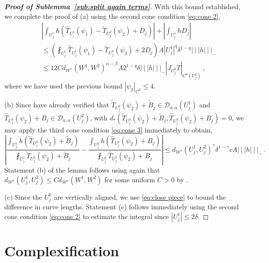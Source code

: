 \documentclass{amsart}
\numberwithin{equation}{section}
\newcommand\cD{{\mathcal D}}
\newcommand\cW{{\mathcal W}}
\newcommand\tT{\widetilde{T}}
\newcommand{\tri}{{|\:\!\!|\:\!\!|}}
\newcommand{\hT}{\widehat{T}}
\begin{document}
\begin{proof}[\bf \em Proof of Sublemma~\ref{sub:split again terms}]
With this bound established, we complete the proof of (a) using the second cone condition
\eqref{eq:cone 2},
\[
\begin{split}
& \left| \int_{U^1_j} h (\hT_{U^1_j}(\psi_1) - \tT_{U^2_j}(\psi_2) + D_j) \right| 
+ \left| \int_{U^1_j} h D_j \right| \\
& \le \left( \fint_{U^1_j} \hT_{U^1_j}(\psi_1) - \tT_{U^2_j}(\psi_2) + 2D_j \right) A |U^1_j|^q \delta^{1-q}
\tri h \tri _- \\
& \le 12 C d_{\cW^s}(W^1, W^2)^{\alpha-\beta} A 2^{1-q} \delta \tri h \tri_- |J_{U^2_j}T|_{C^0(U^2_j)} \, ,
\end{split}
\]
where we have used the previous bound $|\psi_2|_{C^0} \le 4$.

\medskip
\noindent
(b) Since have already verified that $\tT_{U^2_j}(\psi_2) + \tilde B_j \in \cD_{a, \alpha}(U^1_j)$ and $\hT_{U^2_j}(\psi_2)+ B_j \in \cD_{a, \alpha}(U^2_j)$, with $d_*( \tT_{U^2_j}(\psi_2) + \tilde B_j, \hT_{U^2_j}(\psi_2)+ B_j) = 0$, we may apply the third cone condition \eqref{eq:cone 3}
immediately to obtain,
\[
\left| \frac{\int_{U^1_j} h (\tT_{U^2_j}(\psi_2) + \tilde B_j)}{\fint_{U^1_j} \tT_{U^2_j}(\psi_2) + \tilde B_j}
- \frac{\int_{U^2_j} h (\hT_{U^2_j}(\psi_2) + B_j)}{\fint_{U^2_j} \hT_{U^2_j}(\psi_2) + B_j} \right|
\le d_{\cW^s}(U^1_j, U^2_j)^\gamma \delta^{1-\gamma} cA \tri h \tri_- \, .
\]
Statement (b) of the lemma follows using again that $d_{\cW^s}(U^1_j, U^2_j) \le C d_{\cW^s}(W^1, W^2)$ 
for some uniform $C>0$ by \cite[Lemma~3.3]{DZ13}. 

\medskip
\noindent
(c) Since the $U^k_j$ are vertically aligned, we use \eqref{eq:close piece} to bound the difference in curve lengths.
Statement (c) follows immediately using the second cone
condition \eqref{eq:cone 2} to estimate the integral since $|U^1_j| \le 2\delta$.
\end{proof}



\appendix
\section{Complexification}\label{app:complexification}
\end{document}
